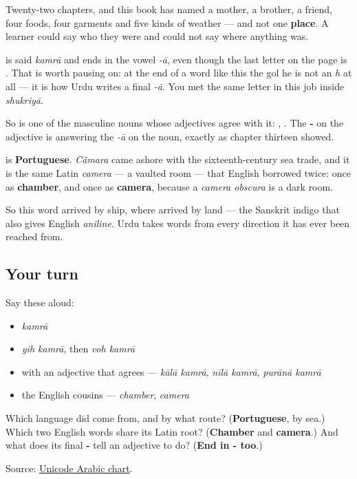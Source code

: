 Twenty-two chapters, and this book has named a mother, a brother, a friend, four foods, four garments and five kinds of weather — and not one \textbf{place}. A learner could say who they were and could not say where anything was.

\textbf{} is said \emph{kamrā} and ends in the vowel \emph{-ā}, even though the last letter on the page is \textbf{}. That is worth pausing on: at the end of a word like this the gol he is not an \emph{h} at all — it is how Urdu writes a final \emph{-ā}. You met the same letter in this job inside \emph{shukriyā}.

So \textbf{} is one of the masculine nouns whose adjectives agree with it: \textbf{ }, \textbf{ }. The \textbf{-} on the adjective is answering the \emph{-ā} on the noun, exactly as chapter thirteen showed.

\begin{cousinweb}
\textbf{} is \textbf{Portuguese}. \emph{Câmara} came ashore with the sixteenth-century sea trade, and it is the same Latin \emph{camera} — a vaulted room — that English borrowed twice: once as \textbf{chamber}, and once as \textbf{camera}, because a \emph{camera obscura} is a dark room.

So this word arrived by ship, where \textbf{} arrived by land — the Sanskrit indigo that also gives English \emph{aniline}. Urdu takes words from every direction it has ever been reached from.
\end{cousinweb}

\subsection*{Your turn}
Say these aloud:

\begin{itemize}
\raggedright
  \item \emph{kamrā}
  \item \emph{yih kamrā}, then \emph{voh kamrā}
  \item with an adjective that agrees — \emph{kālā kamrā}, \emph{nīlā kamrā}, \emph{purānā kamrā}
  \item the English cousins — \emph{chamber}, \emph{camera}
\end{itemize}

\begin{tcolorbox}[breakable,colback=teal!4,colframe=teal!35!black,title={Before you move on}]
Which language did \textbf{} come from, and by what route? (\textbf{Portuguese}, by sea.) Which two English words share its Latin root? (\textbf{Chamber} and \textbf{camera}.) And what does its final \textbf{-} tell an adjective to do? (\textbf{End in - too}.)

Source: \href{https://www.unicode.org/charts/PDF/U0600.pdf}{Unicode Arabic chart}.
\end{tcolorbox}
